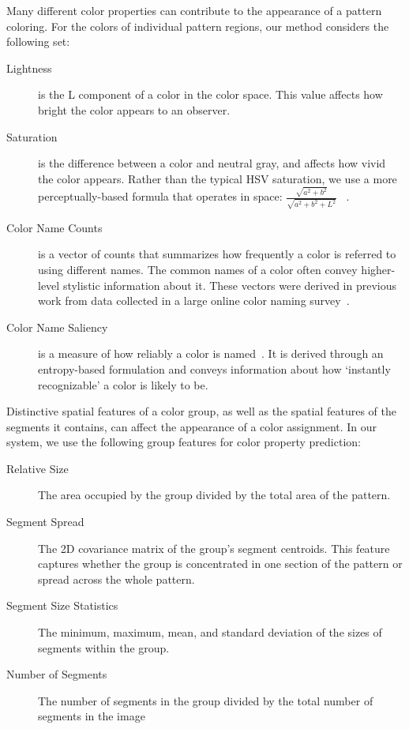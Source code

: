 Many different color properties can contribute to the appearance of a pattern coloring. For the colors of individual pattern regions, our method considers the following set:
\begin{description}
	\item[Lightness] is the L component of a color in the \lab color space. This value affects how bright the color appears to an observer.
	\item[Saturation] is the difference between a color and neutral gray, and affects how vivid the color appears. Rather than the typical HSV saturation, we use a more perceptually-based formula that operates in \lab space: $\frac{\sqrt{a^2+b^2}}{\sqrt{a^2+b^2+L^2}}$ ~\cite{ColorfulnessReference}.
	\item[Color Name Counts] is a vector of counts that summarizes how frequently a color is referred to using different names. The common names of a color often convey higher-level stylistic information about it. These vectors were derived in previous work from data collected in a large online color naming survey~\cite{ColorNamingModels}.
	\item[Color Name Saliency] is a measure of how reliably a color is named~\cite{ColorNamingModels}. It is derived through an entropy-based formulation and conveys information about how `instantly recognizable' a color is likely to be.
\end{description}
%
%
Distinctive spatial features of a color group, as well as the spatial features of the segments it contains, can affect the appearance of a color assignment. In our system, we use the following group features for color property prediction:
\begin{description}
	\item[Relative Size] The area occupied by the group divided by the total area of the pattern.
  \item[Segment Spread] The 2D covariance matrix of the group's segment centroids. This feature captures whether the group is concentrated in one section of the pattern or spread across the whole pattern.
  \item[Segment Size Statistics] The minimum, maximum, mean, and standard deviation of the sizes of segments within the group.
  \item[Number of Segments] The number of segments in the group divided by the total number of segments in the image
\end{description}
